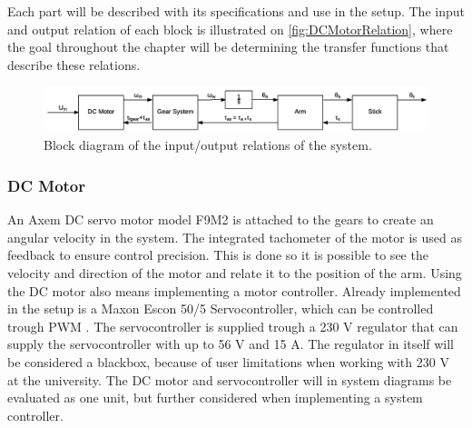 Each part will be described with its specifications and use in the setup. The input and output relation of each block is illustrated on \autoref{fig:DCMotorRelation}, where the goal throughout the chapter will be determining the transfer functions that describe these relations.

\begin{figure} [htbp]
	\centering
	\includegraphics[width=\textwidth]{figures/modeling/InputOutputSystem.png}
	\caption{Block diagram of the input/output relations of the system.} \label{fig:DCMotorRelation}
\end{figure}

\startexplain
\stopexplain

\subsubsection{DC Motor}
An Axem DC servo motor model F9M2 is attached to the gears to create an angular velocity in the system. The integrated tachometer of the motor is used as feedback to ensure control precision. This is done so it is possible to see the velocity and direction of the motor and relate it to the position of the arm. Using the DC motor also means implementing a motor controller. Already implemented in the setup is a Maxon Escon 50/5 Servocontroller, which can be controlled trough PWM \cite{datasheet:maxon}. The servocontroller is supplied trough a 230 V regulator that can supply the servocontroller with up to 56 V and 15 A. The regulator in itself will be considered a blackbox, because of user limitations when working with 230 V at the university. The DC motor and servocontroller will in system diagrams be evaluated as one unit, but further considered when implementing a system controller. 

